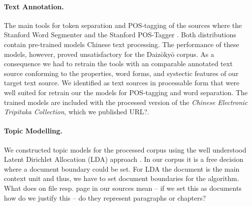 \documentclass[a4paper,10pt]{article}
\newcommand{\TODO}[1]{\begingroup\color{red}#1\endgroup}
\begin{document}
\paragraph{Text Annotation.} 
The main tools for token separation and POS-tagging of the sources where
the Stanford Word Segmenter and the Stanford POS-Tagger
\cite{manning:2014}.  Both distributions contain pre-trained models Chinese
text processing. The performance of these models, however, proved
unsatisfactory for the Daiz{\=o}ky{\=o} corpus. As a consequence we had to
retrain the tools with an comparable annotated text source conforming to
the properties, word forms, and \TODO{systectic} features of our target
text source.  We identified \cite{Lee:12,Wong:16} as text sources in
processable form that were well suited for retrain our the models for
POS-tagging and word separation. The trained models are included with the
processed version of the \textit{Chinese Electronic Tripitaka Collection},
which we published \TODO{URL?}.

\paragraph{Topic Modelling.}
  We constructed topic models for the processed corpus using the well
  understood Latent Dirichlet Allocation (LDA) approach 
  \cite{blei:2012,griffiths:2004}. In our corpus it is a free decision where 
  a document boundary could be set.  For LDA the document is the main context 
  unit and thus, we have to set document boundaries for the algorithm. 
  \TODO{What does on file resp. page in our sources mean -- if we set this as 
  documents how do we justify this -- do they represent paragraphs or chapters?}
\end{document}
